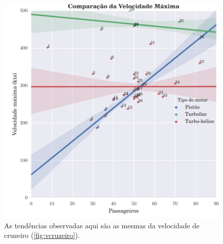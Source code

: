\begin{figure}
\centering
\includegraphics{../autogenerated/graficos_comparativos/vmaxima.pdf}
\caption[Comparação da velocidade máxima]{As tendências observadas aqui são as mesmas da velocidade de cruzeiro (\autoref{fig:vcruzeiro}).}
\label{fig:vmaxima}
\end{figure}

